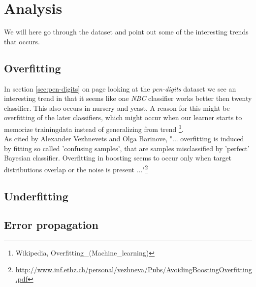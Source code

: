 \documentclass[12pt]{article}
\newcommand{\NBC}{\textit{NBC}}
\begin{document}
\pagebreak
\section{Analysis}
	We will here go through the dataset and point out some of the interesting trends that occurs.
	\subsection{Overfitting}
	In section \ref{sec:pen-digits} on page \pageref{sec:pen-digits} looking at the \textit{pen-digits} dataset we see an interesting trend in that it seems like one \NBC{} classifier works better then twenty classifier. This also occurs in nursery and yeast. A reason for this might be overfitting of the later classifiers, which might occur when our learner starts to memorize trainingdata instead of generalizing from trend \footnote{Wikipedia, Overfitting\_(Machine\_learning)}. \\
	As cited by Alexander Vezhnevets and Olga Barinove, "... overfitting is induced by fitting so called 'confusing samples', that are samples misclassified by 'perfect' Bayesian classifier. Overfitting in boosting seems to occur only when target distributions overlap or the noise is present ..."\footnote{\url{http://www.inf.ethz.ch/personal/vezhneva/Pubs/AvoidingBoostingOverfitting.pdf}}
	\subsection{Underfitting}
	
	\subsection{Error propagation}
		
	
	
	
\end{document}
